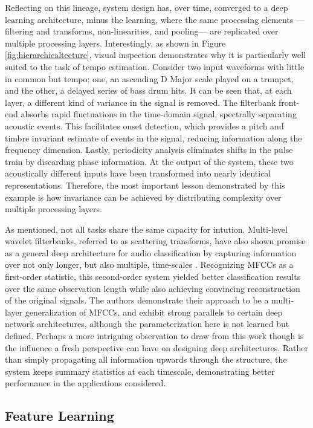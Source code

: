 Reflecting on this lineage, system design has, over time, converged to a deep learning architecture, minus the learning, where the same processing elements ---filtering and transforms, non-linearities, and pooling--- are replicated over multiple processing layers.
Interestingly, as shown in Figure \ref{fig:hierarchicaltecture}, visual inspection demonstrates why it is particularly well suited to the task of tempo estimation.
Consider two input waveforms with little in common but tempo; one, an ascending D Major scale played on a trumpet, and the other, a delayed series of bass drum hits.
It can be seen that, at each layer, a different kind of variance in the signal is removed.
The filterbank front-end absorbs rapid fluctuations in the time-domain signal, spectrally separating acoustic events.
This facilitates onset detection, which provides a pitch and timbre invariant estimate of events in the signal, reducing information along the frequency dimension.
Lastly, periodicity analysis eliminates shifts in the pulse train by discarding phase information.
At the output of the system, these two acoustically different inputs have been transformed into nearly identical representations.
Therefore, the most important lesson demonstrated by this example is how invariance can be achieved by distributing complexity over multiple processing layers.

As mentioned, not all tasks share the same capacity for intution.
Multi-level wavelet filterbanks, referred to as scattering transforms, have also shown promise as a general deep architecture for audio classification by capturing information over not only longer, but also multiple, time-scales \cite{Anden2011}.
Recognizing MFCCs as a first-order statistic, this second-order system yielded better classification results over the same observation length while also achieving convincing reconstruction of the original signals.
The authors demonstrate their approach to be a multi-layer generalization of MFCCs, and exhibit strong parallels to certain deep network architectures, although the parameterization here is not learned but defined.
Perhaps a more intriguing observation to draw from this work though is the influence a fresh perspective can have on designing deep architectures.
Rather than simply propagating all information upwards through the structure, the system keeps summary statistics at each timescale, demonstrating better performance in the applications considered.


\subsection{Feature Learning}
\label{sec:feature_learning}

